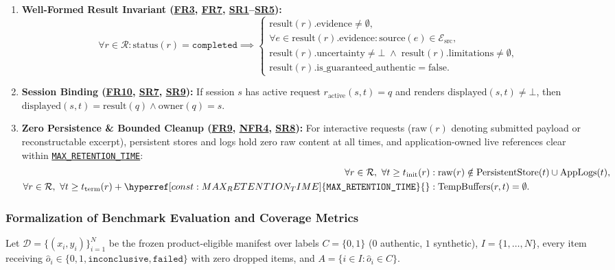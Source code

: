 \documentclass[11pt]{article}
\newcommand{\MaxRetentionTime}{\hyperref[const:MAX_RETENTION_TIME]{\texttt{MAX\_\allowbreak{}RETENTION\_\allowbreak{}TIME}}}
\begin{document}
\begin{enumerate}[leftmargin=*]
    \item \textbf{Well-Formed Result Invariant (\hyperref[FR3]{FR3}, \hyperref[FR7]{FR7}, \hyperref[SR1]{SR1}--\hyperref[SR5]{SR5}):}
    {\small
    \[
        \forall r \in \mathcal{R} : \text{status}(r) = \texttt{completed} \implies
        \begin{cases}
            \text{result}(r).\text{evidence} \neq \emptyset, \\
            \forall e \in \text{result}(r).\text{evidence}: \text{source}(e) \in \mathcal{E}_{\text{src}}, \\
            \text{result}(r).\text{uncertainty} \neq \bot \;\land\; \text{result}(r).\text{limitations} \neq \emptyset, \\
            \text{result}(r).\text{is\_guaranteed\_authentic} = \text{false}.
        \end{cases}
    \]
    }
    \item \textbf{Session Binding (\hyperref[FR10]{FR10}, \hyperref[SR7]{SR7}, \hyperref[SR9]{SR9}):} If session $s$ has active request $r_{\text{active}}(s, t) = q$ and renders $\text{displayed}(s, t) \neq \bot$, then $\text{displayed}(s, t) = \text{result}(q) \land \text{owner}(q) = s$.
    \item \textbf{Zero Persistence \& Bounded Cleanup (\hyperref[FR9]{FR9}, \hyperref[NFR4]{NFR4}, \hyperref[SR8]{SR8}):} For interactive requests ($\text{raw}(r)$ denoting submitted payload or reconstructable excerpt), persistent stores and logs hold zero raw content at all times, and application-owned live references clear within \MaxRetentionTime{}:
    \begin{align*}
        \forall r \in \mathcal{R},\ \forall t \ge t_{\text{init}}(r) &: \text{raw}(r) \notin \text{PersistentStore}(t) \cup \text{AppLogs}(t), \\
        \forall r \in \mathcal{R},\ \forall t \ge t_{\text{term}}(r) + \MaxRetentionTime{} &: \text{TempBuffers}(r, t) = \emptyset.
    \end{align*}
\end{enumerate}

\subsubsection{Formalization of Benchmark Evaluation and Coverage Metrics}

Let $\mathcal D=\{(x_i,y_i)\}_{i=1}^N$ be the frozen product-eligible manifest over labels $C=\{0,1\}$ ($0$ authentic, $1$ synthetic), $I=\{1,\ldots,N\}$, every item receiving $\hat o_i\in\{0,1,\texttt{inconclusive},\texttt{failed}\}$ with zero dropped items, and $A=\{i\in I:\hat o_i\in C\}$.
\end{document}
